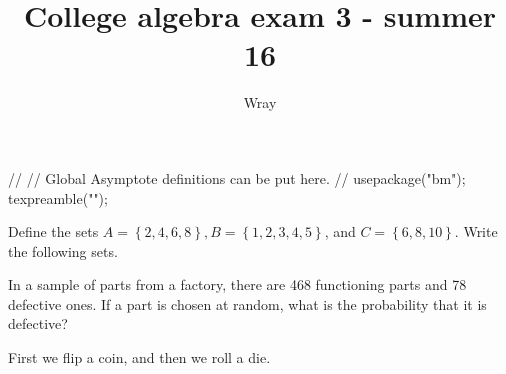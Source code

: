 \documentclass[12pt]{exam}
\title{College algebra exam 3 - summer 16}
\author{Wray}
\begin{document}
\begin{asydef}
//
// Global Asymptote definitions can be put here.
//
usepackage("bm");
texpreamble("\def\V#1{\bm{#1}}");
\end{asydef}

\bigskip
\bigskip

\begin{questions}

\question[6]
Define the sets $A = \left\lbrace 2,4, 6, 8 \right\rbrace, B = \left\lbrace 1,2,3,4,5 \right\rbrace$, and
$C = \left\lbrace 6,8,10 \right\rbrace$.  Write the following sets.
\bigskip


\question[6] 
In a sample of parts from a factory, there are 468 functioning parts and 78 defective ones.  If a part is chosen at random, what is the probability that it is defective?  

\newpage
\question[6]
First we flip a coin, and then we roll a die.
\end{questions}
\end{document}
